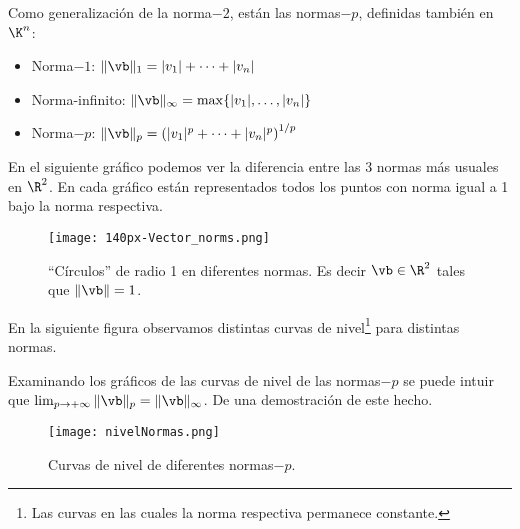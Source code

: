 \tccdefi
Como generalización de la norma$-2$, están las normas$-p$, definidas también en  $\K^{n}$:

\begin{itemize}
\item Norma$-1$: $\| \vb \|_1 = |v_1| + \dots + |v_n|$
\item Norma-infinito: $\| \vb \|_\infty = \max\{|v_1|, \dots, |v_n|\}$
\item Norma$-p$: $\| \vb \|_p = \left(|v_1|^p  + \dots + |v_n|^p \right)^{1/p}$
\end{itemize}
\etcc

En el siguiente gr\'afico podemos ver la diferencia entre las 3 normas m\'as usuales en $\R^2$. En cada gr\'afico est\'an representados todos los puntos con norma igual a 1 bajo la norma respectiva.
\clearpage
\begin{figure}
\texttt{[image: 140px-Vector\_norms.png]}
\caption{``Círculos''  de radio 1 en diferentes normas. Es decir $\vb\in \R^2$ tales que $\|\vb\|=1$.}
\end{figure}
En la siguiente figura observamos distintas curvas de nivel\footnote{Las curvas en las cuales la norma respectiva permanece constante.} para distintas normas.
\begin{ej}
 Examinando los gráficos de las curvas de
nivel de las normas$-p$ se puede intuir que  $\lim_{p\to +\infty}\|\vb\|_p=\|\vb\|_\infty$. De una demostración de este hecho.
\end{ej}
\begin{figure}
 \texttt{[image: nivelNormas.png]}
\caption{Curvas de nivel de diferentes normas$-p$.}
\end{figure}
%
